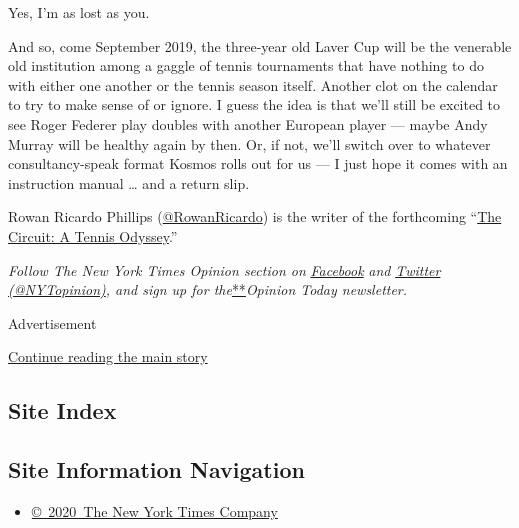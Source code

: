 Yes, I'm as lost as you.

And so, come September 2019, the three-year old Laver Cup will be the
venerable old institution among a gaggle of tennis tournaments that have
nothing to do with either one another or the tennis season itself.
Another clot on the calendar to try to make sense of or ignore. I guess
the idea is that we'll still be excited to see Roger Federer play
doubles with another European player --- maybe Andy Murray will be
healthy again by then. Or, if not, we'll switch over to whatever
consultancy-speak format Kosmos rolls out for us --- I just hope it
comes with an instruction manual \ldots{} and a return slip.

Rowan Ricardo Phillips
(\href{https://twitter.com/rowanricardo?lang=en}{@RowanRicardo}) is the
writer of the forthcoming
``\href{https://us.macmillan.com/books/9780374123772}{The Circuit: A
Tennis Odyssey}.''

\emph{Follow The New York Times Opinion section on}
\href{https://www.facebookcorewwwi.onion/nytopinion}{\emph{Facebook}}
\emph{and} \href{http://twitter.com/NYTOpinion}{\emph{Twitter
(@NYTopinion)}}\emph{, and sign up for
the}\href{http://www.nytimes3xbfgragh.onion/newsletters/opiniontoday/}{**}\emph{Opinion
Today newsletter.}

Advertisement

\protect\hyperlink{after-bottom}{Continue reading the main story}

\hypertarget{site-index}{%
\subsection{Site Index}\label{site-index}}

\hypertarget{site-information-navigation}{%
\subsection{Site Information
Navigation}\label{site-information-navigation}}

\begin{itemize}
\tightlist
\item
  \href{https://help.nytimes3xbfgragh.onion/hc/en-us/articles/115014792127-Copyright-notice}{©~2020~The
  New York Times Company}
\end{itemize}

